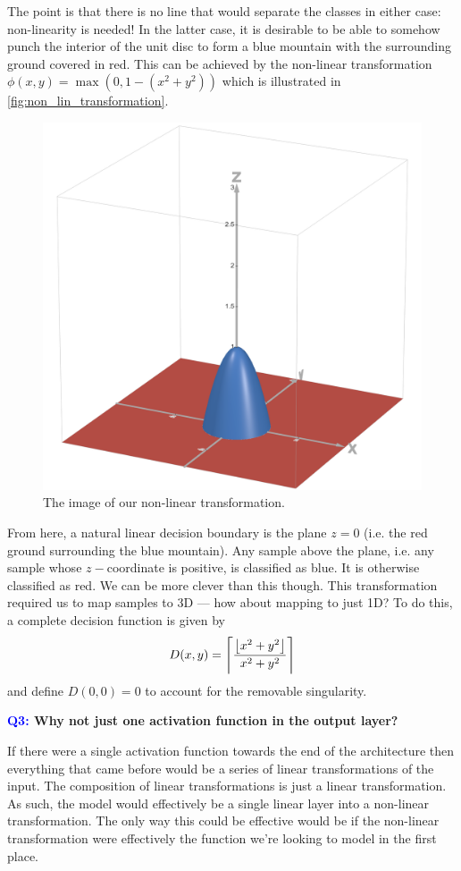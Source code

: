 \documentclass[11pt]{article}
\begin{document}
The point is that there is no line that would separate the classes in either case: non-linearity is needed! In the latter case, it is desirable to be able to somehow punch the interior of the unit disc to form a blue mountain with the surrounding ground covered in red. This can be achieved by the non-linear transformation $\phi(x,y)=\max(0,1-(x^2+y^2))$ which is illustrated in \autoref{fig:non_lin_transformation}.

\begin{figure}[ht]
    \centering
    \includegraphics[width=0.40\columnwidth]{./figures/neural_nets//NLA_non_lin_transform.png}
    \caption{The image of our non-linear transformation.}
    \label{fig:non_lin_transformation}
\end{figure}

From here, a natural linear decision boundary is the plane $z=0$ (i.e. the red ground surrounding the blue mountain). Any sample above the plane, i.e. any sample whose $z-$coordinate is positive, is classified as blue. It is otherwise classified as red. We can be more clever than this though. This transformation required us to map samples to 3D — how about mapping to just 1D? To do this, a complete decision function is given by
$$
D(x,y)=\left\lceil\frac{\left\lfloor x^2+y^2\right\rfloor}{x^2+y^2}\right\rceil
$$
and define $D(0,0)=0$ to account for the removable singularity.

\begin{center}
    \textbf{\textcolor{blue}{Q3:} Why not just one activation function in the output layer?}
\end{center}
If there were a single activation function towards the end of the architecture then everything that came before would be a series of linear transformations of the input. The composition of linear transformations is just a linear transformation. As such, the model would effectively be a single linear layer into a non-linear transformation. The only way this could be effective would be if the non-linear transformation were effectively the function we're looking to model in the first place.
\end{document}
